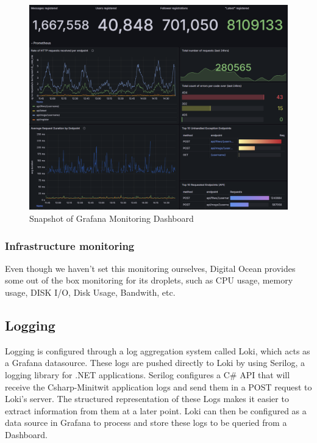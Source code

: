 \begin{figure}[H]
    \centering
    \includegraphics[height=0.9\textwidth]{images/Monitoring-latest.png}
    \caption{Snapshot of Grafana Monitoring Dashboard}
    \label{fig:grafana-dashboard}
\end{figure}

\subsubsection{Infrastructure monitoring}
Even though we haven't set this monitoring ourselves, Digital Ocean provides some out of the box monitoring for its droplets, such as CPU usage, memory usage, DISK I/O, Disk Usage, Bandwith, etc.

\subsection{Logging}
Logging is configured through a log aggregation system called Loki, which acts as a Grafana datasource. These logs are pushed directly to Loki by using Serilog, a logging library for .NET applications. Serilog configures a C\# API that will receive the Csharp-Minitwit application logs and send them in a POST request to Loki's server. The structured representation of these Logs makes it easier to extract information from them at a later point. Loki can then be configured as a data source in Grafana to process and store these logs to be queried from a Dashboard.\newline

